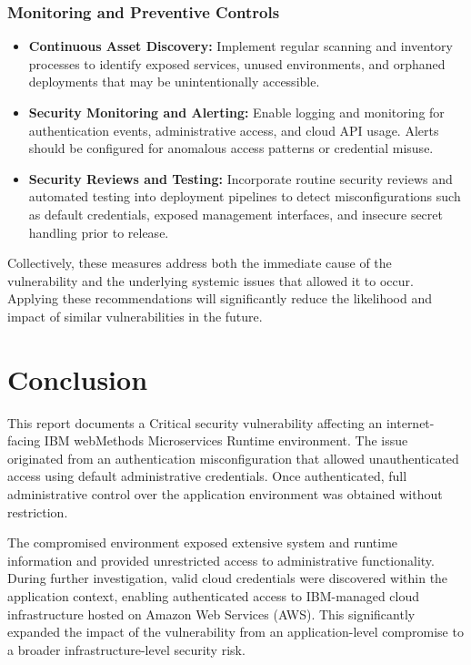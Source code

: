 \documentclass[12pt,a4paper]{report}
\begin{document}
\subsection{Monitoring and Preventive Controls}

\begin{itemize}
	\item \textbf{Continuous Asset Discovery:} Implement regular scanning and inventory processes to identify exposed services, unused environments, and orphaned deployments that may be unintentionally accessible.

	\item \textbf{Security Monitoring and Alerting:} Enable logging and monitoring for authentication events, administrative access, and cloud API usage. Alerts should be configured for anomalous access patterns or credential misuse.

	\item \textbf{Security Reviews and Testing:} Incorporate routine security reviews and automated testing into deployment pipelines to detect misconfigurations such as default credentials, exposed management interfaces, and insecure secret handling prior to release.
\end{itemize}

Collectively, these measures address both the immediate cause of the vulnerability and the underlying systemic issues that allowed it to occur. Applying these recommendations will significantly reduce the likelihood and impact of similar vulnerabilities in the future.

\clearpage
\chapter{Conclusion}

This report documents a Critical security vulnerability affecting an internet-facing IBM webMethods Microservices Runtime environment. The issue originated from an authentication misconfiguration that allowed unauthenticated access using default administrative credentials. Once authenticated, full administrative control over the application environment was obtained without restriction.

The compromised environment exposed extensive system and runtime information and provided unrestricted access to administrative functionality. During further investigation, valid cloud credentials were discovered within the application context, enabling authenticated access to IBM-managed cloud infrastructure hosted on Amazon Web Services (AWS). This significantly expanded the impact of the vulnerability from an application-level compromise to a broader infrastructure-level security risk.
\end{document}
